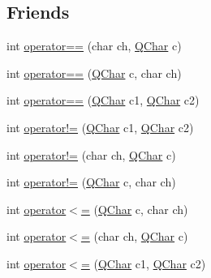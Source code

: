 \subsection*{Friends}
\begin{DoxyCompactItemize}
\item 
int \mbox{\hyperlink{class_q_char_a626d918781f80dcff42d03ff6749930d}{operator==}} (char ch, \mbox{\hyperlink{class_q_char}{Q\+Char}} c)
\item 
int \mbox{\hyperlink{class_q_char_a2deebc031e4e7ddaf75f71439b0ec58a}{operator==}} (\mbox{\hyperlink{class_q_char}{Q\+Char}} c, char ch)
\item 
int \mbox{\hyperlink{class_q_char_acf4eb1b3bdf933d74ba2506bac36c5a0}{operator==}} (\mbox{\hyperlink{class_q_char}{Q\+Char}} c1, \mbox{\hyperlink{class_q_char}{Q\+Char}} c2)
\item 
int \mbox{\hyperlink{class_q_char_a166bb280e1dab17703d96e00c39c97ab}{operator!=}} (\mbox{\hyperlink{class_q_char}{Q\+Char}} c1, \mbox{\hyperlink{class_q_char}{Q\+Char}} c2)
\item 
int \mbox{\hyperlink{class_q_char_a1b92f64e5743d28c56a489a5d7ad585b}{operator!=}} (char ch, \mbox{\hyperlink{class_q_char}{Q\+Char}} c)
\item 
int \mbox{\hyperlink{class_q_char_adace471124ee79e40a78029bb638ae7a}{operator!=}} (\mbox{\hyperlink{class_q_char}{Q\+Char}} c, char ch)
\item 
int \mbox{\hyperlink{class_q_char_a509b164e80d1625ab984e0ed147c31c6}{operator$<$=}} (\mbox{\hyperlink{class_q_char}{Q\+Char}} c, char ch)
\item 
int \mbox{\hyperlink{class_q_char_a93bcb6e42c1ed37d592b901d55f20449}{operator$<$=}} (char ch, \mbox{\hyperlink{class_q_char}{Q\+Char}} c)
\item 
int \mbox{\hyperlink{class_q_char_a9abfb242d26e415adaa25d52fd8a93fd}{operator$<$=}} (\mbox{\hyperlink{class_q_char}{Q\+Char}} c1, \mbox{\hyperlink{class_q_char}{Q\+Char}} c2)
\end{DoxyCompactItemize}
